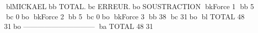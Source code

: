 blMICKAELbb           TOTAL.bc      ERREUR.bo
SOUSTRACTION
bkForce      1     bb  5	bc        0bo
bkForce      2     bb  5	bc        0bo
bkForce      3     bb 38	bc       31bo
bl TOTAL            48	       31bo
------------------------------
ba TOTAL            48	       31
